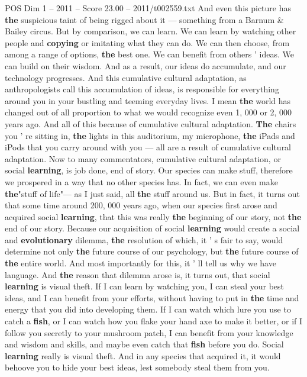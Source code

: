 \begin{textsample}{POS Dim 1 – 2011 – Score 23.00 – 2011/t002559.txt}
And even this picture has \textbf{the} suspicious taint of being rigged about it — something from a Barnum \& Bailey circus.
But by comparison, we can learn.
We can learn by watching other people and \textbf{copying} or imitating what they can do.
We can then choose, from among a range of options, \textbf{the} best one.
We can benefit from others ' ideas.
We can build on their wisdom.
And as a result, our ideas do accumulate, and our technology progresses.
And this cumulative cultural adaptation, as anthropologists call this accumulation of ideas, is responsible for everything around you in your bustling and teeming everyday lives.
I mean \textbf{the} world has changed out of all proportion to what we would recognize even 1, 000 or 2, 000 years ago.
And all of this because of cumulative cultural adaptation. \textbf{The} chairs you ' re sitting in, \textbf{the} lights in this auditorium, my microphone, \textbf{the} iPads and iPods that you carry around with you — all are a result of cumulative cultural adaptation.
Now to many commentators, cumulative cultural adaptation, or social \textbf{learning}, is job done, end of story.
Our species can make stuff, therefore we prospered in a way that no other species has.
In fact, we can even make \textbf{the}"stuff of life"— as I just said, all \textbf{the} stuff around us.
But in fact, it turns out that some time around 200, 000 years ago, when our species first arose and acquired social \textbf{learning}, that this was really \textbf{the} beginning of our story, not \textbf{the} end of our story.
Because our acquisition of social \textbf{learning} would create a social and \textbf{evolutionary} dilemma, \textbf{the} resolution of which, it ' s fair to say, would determine not only \textbf{the} future course of our psychology, but \textbf{the} future course of \textbf{the} entire world.
And most importantly for this, it ' ll tell us why we have language.
And \textbf{the} reason that dilemma arose is, it turns out, that social \textbf{learning} is visual theft.
If I can learn by watching you, I can steal your best ideas, and I can benefit from your efforts, without having to put in \textbf{the} time and energy that you did into developing them.
If I can watch which lure you use to catch a \textbf{fish}, or I can watch how you flake your hand axe to make it better, or if I follow you secretly to your mushroom patch, I can benefit from your knowledge and wisdom and skills, and maybe even catch that \textbf{fish} before you do.
Social \textbf{learning} really is visual theft.
And in any species that acquired it, it would behoove you to hide your best ideas, lest somebody steal them from you.

\end{textsample}
